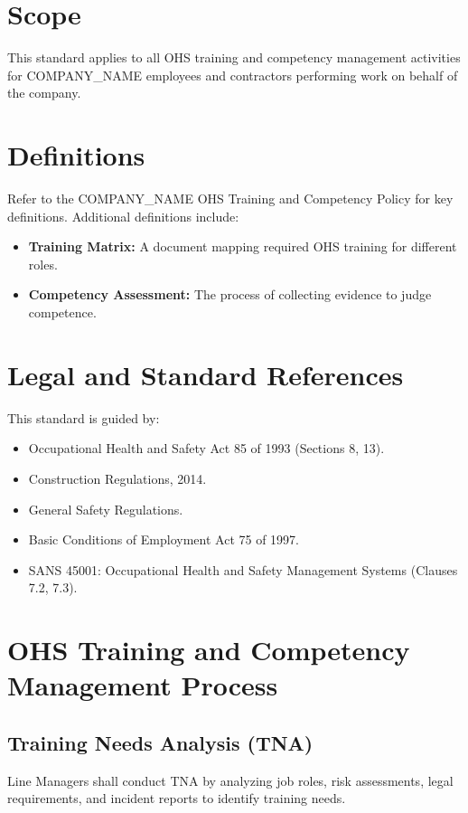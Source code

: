 \documentclass[12pt]{article}
\begin{document}
\section{Scope}
This standard applies to all OHS training and competency management activities for {{COMPANY_NAME}} employees and contractors performing work on behalf of the company.

\section{Definitions}
Refer to the {{COMPANY_NAME}} OHS Training and Competency Policy for key definitions. Additional definitions include:
\begin{itemize}
    \item \textbf{Training Matrix:} A document mapping required OHS training for different roles.
    \item \textbf{Competency Assessment:} The process of collecting evidence to judge competence.
\end{itemize}

\section{Legal and Standard References}
This standard is guided by:
\begin{itemize}
    \item Occupational Health and Safety Act 85 of 1993 (Sections 8, 13).
    \item Construction Regulations, 2014.
    \item General Safety Regulations.
    \item Basic Conditions of Employment Act 75 of 1997.
    \item SANS 45001: Occupational Health and Safety Management Systems (Clauses 7.2, 7.3).
\end{itemize}

\section{OHS Training and Competency Management Process}

\subsection{Training Needs Analysis (TNA)}
Line Managers shall conduct TNA by analyzing job roles, risk assessments, legal requirements, and incident reports to identify training needs.
\end{document}

